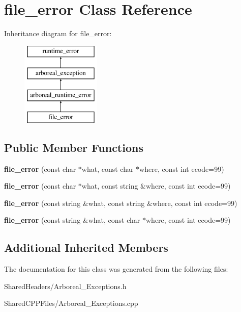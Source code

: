 \hypertarget{classfile__error}{}\section{file\+\_\+error Class Reference}
\label{classfile__error}
Inheritance diagram for file\+\_\+error\+:\begin{figure}[H]
\begin{center}
\leavevmode
\includegraphics[height=4.000000cm]{classfile__error}
\end{center}
\end{figure}
\subsection*{Public Member Functions}
\begin{DoxyCompactItemize}
\item 
{\bfseries file\+\_\+error} (const char $\ast$what, const char $\ast$where, const int ecode=99)\hypertarget{classfile__error_a10da41c5d15b25fdafa97ae79523e242}{}\label{classfile__error_a10da41c5d15b25fdafa97ae79523e242}

\item 
{\bfseries file\+\_\+error} (const char $\ast$what, const string \&where, const int ecode=99)\hypertarget{classfile__error_ae70ca16a0a8eee95a88a64128b7fcbad}{}\label{classfile__error_ae70ca16a0a8eee95a88a64128b7fcbad}

\item 
{\bfseries file\+\_\+error} (const string \&what, const string \&where, const int ecode=99)\hypertarget{classfile__error_a9b1c03f989df972ca3201f984ddece6d}{}\label{classfile__error_a9b1c03f989df972ca3201f984ddece6d}

\item 
{\bfseries file\+\_\+error} (const string \&what, const char $\ast$where, const int ecode=99)\hypertarget{classfile__error_a2698ca75c20dd3ffc5adb8d470fff246}{}\label{classfile__error_a2698ca75c20dd3ffc5adb8d470fff246}

\end{DoxyCompactItemize}
\subsection*{Additional Inherited Members}


The documentation for this class was generated from the following files\+:\begin{DoxyCompactItemize}
\item 
Shared\+Headers/Arboreal\+\_\+\+Exceptions.\+h\item 
Shared\+C\+P\+P\+Files/Arboreal\+\_\+\+Exceptions.\+cpp\end{DoxyCompactItemize}
